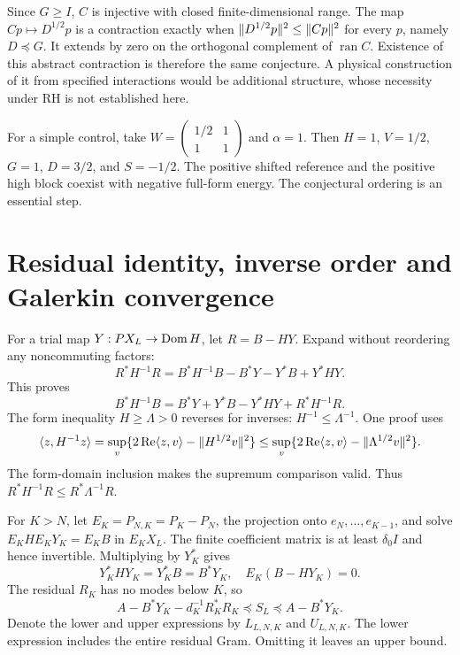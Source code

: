 Since $G\ge I$, $C$ is injective with closed finite-dimensional range.
The map $Cp\mapsto D^{1/2}p$ is a contraction exactly when
$\lVert D^{1/2}p\rVert^2\le\lVert Cp\rVert^2$ for every $p$, namely $D\preceq G$.
It extends by zero on the orthogonal complement of $\operatorname{ran}C$.
Existence of this abstract contraction is therefore the same conjecture.
A physical construction of it from specified interactions would be
additional structure, whose necessity under RH is not established here.

For a simple control, take
$W=\left(\begin{smallmatrix}1/2&1\\1&1\end{smallmatrix}\right)$ and
$\alpha=1$. Then $H=1$, $V=1/2$, $G=1$, $D=3/2$, and $S=-1/2$.
The positive shifted reference and the positive high block coexist with
negative full-form energy. The conjectural ordering is an essential step.

\section{Residual identity, inverse order and Galerkin convergence}
For a trial map $Y:PX_L\to\operatorname{Dom} H$, let $R=B-HY$. Expand without
reordering any noncommuting factors:
\[
R^*H^{-1}R=B^*H^{-1}B-B^*Y-Y^*B+Y^*HY.
\]
This proves
\begin{equation}\label{d:residual}
B^*H^{-1}B=B^*Y+Y^*B-Y^*HY+R^*H^{-1}R.
\end{equation}
The form inequality $H\ge\Lambda>0$ reverses for inverses:
$H^{-1}\le\Lambda^{-1}$. One proof uses
\[
\langle z,H^{-1}z\rangle=\sup_v\{2\operatorname{Re}\langle z,v\rangle-\lVert H^{1/2}v\rVert^2\}
\le\sup_v\{2\operatorname{Re}\langle z,v\rangle-\lVert \Lambda^{1/2}v\rVert^2\}.
\]
The form-domain inclusion makes the supremum comparison valid.
Thus $R^*H^{-1}R\le R^*\Lambda^{-1}R$.

For $K>N$, let $E_K=P_{N,K}=P_K-P_N$, the projection onto
$e_N,\ldots,e_{K-1}$, and solve $E_KHE_KY_K=E_KB$ in $E_KX_L$.
The finite coefficient matrix is at least $\delta_0I$ and hence invertible.
Multiplying by $Y_K^*$ gives
\[
Y_K^*HY_K=Y_K^*B=B^*Y_K,
\quad E_K(B-HY_K)=0.
\]
The residual $R_K$ has no modes below $K$, so
\begin{equation}\label{d:enclosures}
A-B^*Y_K-d_K^{-1}R_K^*R_K
\preceq S_L\preceq A-B^*Y_K.
\end{equation}
Denote the lower and upper expressions by $L_{L,N,K}$ and $U_{L,N,K}$.
The lower expression includes the entire residual Gram.
Omitting it leaves an upper bound.


